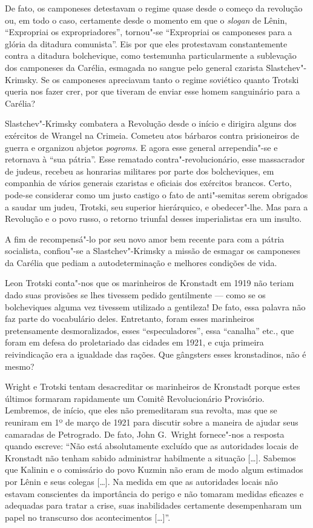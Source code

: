 De fato, os camponeses detestavam o regime quase desde o começo da
revolução ou, em todo o caso, certamente desde o momento em que o \textit{slogan}
de Lênin, “Expropriai os expropriadores”, tornou"-se “Expropriai os
camponeses para a glória da ditadura comunista”. Eis por que eles
protestavam constantemente contra a ditadura bolchevique, como
testemunha particularmente a sublevação dos camponeses da Carélia,
esmagada no sangue pelo general czarista Slastchev"-Krimsky. Se os
camponeses apreciavam tanto o regime soviético quanto Trotski queria
nos fazer crer, por que tiveram de enviar esse homem sanguinário para a
Carélia?

Slastchev"-Krimsky combatera a Revolução desde o início e dirigira
alguns dos exércitos de Wrangel na Crimeia. Cometeu atos bárbaros
contra prisioneiros de guerra e organizou abjetos \textit{pogroms}. E agora
esse general arrependia"-se e retornava à “sua pátria”. Esse rematado
contra"-revolucionário, esse massacrador de judeus, recebeu as
honrarias militares por parte dos bolcheviques, em companhia de vários
generais czaristas e oficiais dos exércitos brancos. Certo, pode-se
considerar como um justo castigo o fato de anti"-semitas serem
obrigados a saudar um judeu, Trotski, seu superior hierárquico, e
obedecer"-lhe. Mas para a Revolução e o povo russo, o retorno triunfal
desses imperialistas era um insulto.

A fim de recompensá"-lo por seu novo amor bem recente para com a pátria
socialista, confiou"-se a Slastchev"-Krimsky a missão de esmagar os
camponeses da Carélia que pediam a autodeterminação e melhores
condições de vida.

Leon Trotski conta"-nos que os marinheiros de Kronstadt em 1919 não
teriam dado suas provisões se lhes tivessem pedido gentilmente --- como
se os bolcheviques alguma vez tivessem utilizado a gentileza! De fato,
essa palavra não faz parte do vocabulário deles. Entretanto, foram
esses marinheiros pretensamente desmoralizados, esses “especuladores”,
essa “canalha” etc., que foram em defesa do proletariado das cidades em
1921, e cuja primeira reivindicação era a igualdade das rações. Que
gângsters esses kronstadinos, não é mesmo?

Wright e Trotski tentam desacreditar os marinheiros de Kronstadt porque
estes últimos formaram rapidamente um Comitê Revolucionário Provisório.
Lembremos, de início, que eles não premeditaram sua revolta, mas que se
reuniram em 1º de março de 1921 para discutir sobre a maneira de ajudar
seus camaradas de Petrogrado. De fato, John G.~Wright fornece"-nos a
resposta quando escreve: “Não está absolutamente excluído que as
autoridades locais de Kronstadt não tenham sabido administrar
habilmente a situação [\ldots]. Sabemos que Kalinin e o comissário do povo
Kuzmin não eram de modo algum estimados por Lênin e seus colegas [\ldots].
Na medida em que as autoridades locais não estavam conscientes da
importância do perigo e não tomaram medidas eficazes e adequadas para
tratar a crise, suas inabilidades certamente desempenharam um papel no
transcurso dos acontecimentos [\ldots]”.


